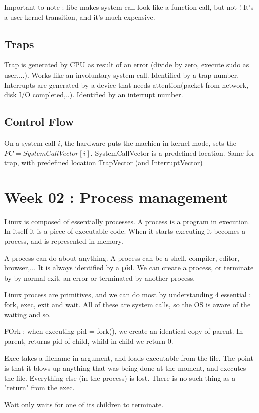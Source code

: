 \documentclass[12pt,a4paper]{article}
\begin{document}
Important to note : libc makes system call look like a function call, but not ! It's a user-kernel transition, and it's much expensive.

\subsection{Traps }
Trap is generated by CPU as result of an error (divide by zero, execute sudo as user,...). Works like an involuntary system call. Identified by a trap number. Interrupts are generated by a device that needs attention(packet from network, disk I/O completed,..). Identified by an interrupt number.

\subsection{Control Flow}
On a system call $i$, the hardware puts the machien in kernel mode, sets the $PC=SystemCallVector[i]$. SystemCallVector is a predefined location. Same for trap, with predefined location TrapVector (and InterruptVector)

\section{Week 02 : Process management}
Linux is composed of essentially processes. A process is a program in execution. In itself it is a piece of executable code. When it starts executing it becomes a process, and is represented in memory.

A process can do about anything. A process can be a shell, compiler, editor, browser,... It is always identified by a \textbf{pid}. We can create a process, or terminate by by normal exit, an error or terminated by another process.

Linux process are primitives, and we can do most by understanding 4 essential : fork, exec, exit and wait. All of these are system calls, so the OS is aware of the waiting and so.

FOrk : when executing pid = fork(), we create an identical copy of parent. In parent, returns pid of child, whild in child we return 0.

Exec takes a filename in argument, and loads executable from the file. The point is that it blows up anything that was being done at the moment, and executes the file. Everything else (in the process) is lost. There is no such thing as a "return" from the exec. 

Wait only waits for one of its children to terminate.
\end{document}
